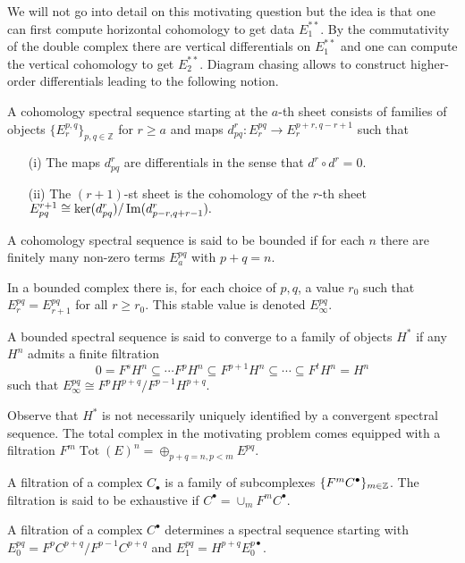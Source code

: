 We will not go into detail on this motivating question but the idea is that one can first compute horizontal cohomology to get data $E^{**}_1$.
By the commutativity of the double complex there are vertical differentials on $E^{**}_1$ and one can compute the vertical cohomology to get $E^{**}_2$.
Diagram chasing allows to construct higher-order differentials leading to the following notion.
\begin{definition}
  A cohomology spectral sequence starting at the $a$-th sheet consists of families of objects $ \{E^{p,q}_r\}_{p,q\in \mathbb{Z}}$ for $r\geq a$ and maps
  $d_{pq}^r : E^{pq}_r \to E^{p+r,q-r+1}_r $
  such that
  \begin{enumerate}
    \item[(i)]  The maps $d^r_{pq}$ are differentials in the sense that
    $d^r \circ d^r = 0.$
    \item[(ii)] The $(r+1)$-st sheet is the cohomology of the $r$-th sheet
    $E_{pq}^{r+1} \cong \ker(d_{pq}^r)/ \operatorname{Im}(d_{p-r,q+r-1}^r).$
  \end{enumerate}
\end{definition}
\begin{definition}
  A cohomology spectral sequence is said to be bounded if for each $n$ there are finitely many non-zero terms $E^{pq}_a$ with $p+q = n$.
\end{definition}
In a bounded complex there is, for each choice of $p,q$, a value $r_0$ such that $E_{r}^{pq}= E_{r+1}^{pq}$ for all $r \geq r_0$. This stable value is denoted $E^{pq}_\infty$.
\begin{definition}
  A bounded spectral sequence is said to converge to a family of objects $H^*$ if any $H^n$ admits a finite filtration
  $$0 = F^s H^n \subseteq \cdots F^p H^n \subseteq F^{p+1}H^n \subseteq \cdots \subseteq F^t H^n = H^n $$
  such that $E^{pq}_\infty \cong F^p H^{p+q} / F^{p-1} H^{p+q}$.
\end{definition}
Observe that $H^*$ is not necessarily uniquely identified by a convergent spectral sequence.
The total complex in the motivating problem comes equipped with a filtration $F^{m} \operatorname{Tot}(E)^n = \oplus_{p+q = n, p <m} E^{pq}.$
\begin{definition}
  A filtration of a complex $C_\bullet$ is a family of subcomplexes $\{F^m C^\bullet\}_{m\in \mathbb{Z}}$.
  The filtration is said to be exhaustive if $C^\bullet = \cup_m F^mC^\bullet$.
\end{definition}
\begin{proposition}
 A filtration of a complex $C^\bullet$ determines a spectral sequence starting with $E^{pq}_0 = F^p C^{p+q}/F^{p-1}C^{p+q}$ and $E^{pq}_1= H^{p+q} E^{p\bullet}_0$.
\end{proposition}
